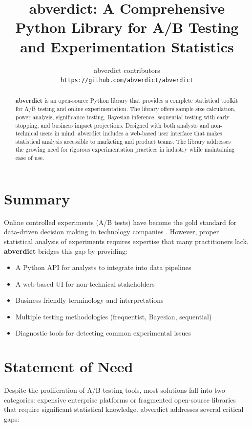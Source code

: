 \documentclass[10pt,a4paper]{article}
\title{\textbf{abverdict}: A Comprehensive Python Library for A/B Testing and Experimentation Statistics}
\author{
    abverdict contributors\\
    \texttt{https://github.com/abverdict/abverdict}
}
\date{}
\begin{document}
\maketitle

\begin{abstract}
\textbf{abverdict} is an open-source Python library that provides a complete statistical toolkit for A/B testing and online experimentation. The library offers sample size calculation, power analysis, significance testing, Bayesian inference, sequential testing with early stopping, and business impact projections. Designed with both analysts and non-technical users in mind, abverdict includes a web-based user interface that makes statistical analysis accessible to marketing and product teams. The library addresses the growing need for rigorous experimentation practices in industry while maintaining ease of use.
\end{abstract}

\section*{Summary}

Online controlled experiments (A/B tests) have become the gold standard for data-driven decision making in technology companies \citep{kohavi2020trustworthy}. However, proper statistical analysis of experiments requires expertise that many practitioners lack. \textbf{abverdict} bridges this gap by providing:

\begin{itemize}
    \item A Python API for analysts to integrate into data pipelines
    \item A web-based UI for non-technical stakeholders
    \item Business-friendly terminology and interpretations
    \item Multiple testing methodologies (frequentist, Bayesian, sequential)
    \item Diagnostic tools for detecting common experimental issues
\end{itemize}

\section*{Statement of Need}

Despite the proliferation of A/B testing tools, most solutions fall into two categories: expensive enterprise platforms or fragmented open-source libraries that require significant statistical knowledge. abverdict addresses several critical gaps:
\end{document}
